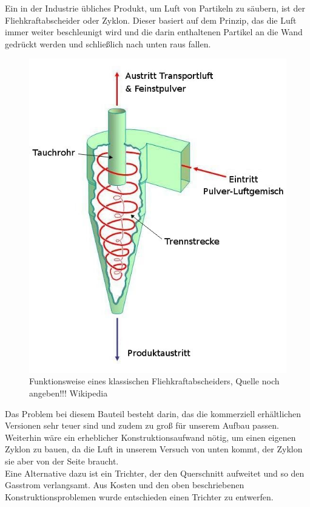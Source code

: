 Ein in der Industrie übliches Produkt, um Luft von Partikeln zu säubern, ist der Fliehkraftabscheider oder Zyklon. Dieser basiert auf dem Prinzip, das die Luft immer weiter beschleunigt wird und die darin enthaltenen Partikel an die Wand gedrückt werden und schließlich nach unten raus fallen. \\


\begin{figure}[h]
	\begin{center}
		\includegraphics[scale=0.5]{Umsetzung_Fliehkraftabscheider.jpg}
		\caption[Funktionsweise Fliehkraftabscheider]{Funktionsweise eines klassischen Fliehkraftabscheiders, Quelle noch angeben!!! Wikipedia}
	\end{center}
\end{figure}



Das Problem bei diesem Bauteil besteht darin, das die kommerziell erhältlichen Versionen sehr teuer sind und zudem zu groß für unserem Aufbau passen. \\
Weiterhin wäre ein erheblicher Konstruktionsaufwand nötig, um einen eigenen Zyklon zu bauen, da die Luft in unserem Versuch von unten kommt, der Zyklon sie aber von der Seite braucht. \\
Eine Alternative dazu ist ein Trichter, der den Querschnitt aufweitet und so den Gasstrom verlangsamt. Aus Kosten und den oben beschriebenen Konstruktionsproblemen wurde entschieden einen Trichter zu entwerfen.



